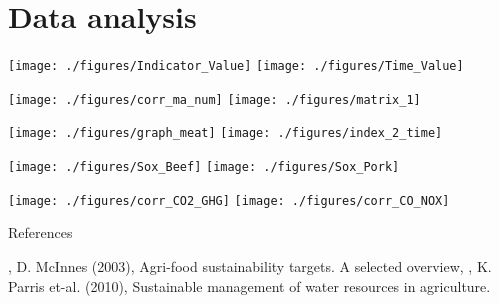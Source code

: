 \documentclass[t,9pt,aspectratio=169]{beamer}
\begin{document}
\section{Data analysis}
\begin{frame}
\begin{center}
\texttt{[image: ./figures/Indicator\_Value]}  \texttt{[image: ./figures/Time\_Value]}
\end{center}
\end{frame} 

\begin{frame}
\begin{center}
\texttt{[image: ./figures/corr\_ma\_num]} \texttt{[image: ./figures/matrix\_1]} 
\end{center}
\end{frame} 

\begin{frame}
\begin{center}
\texttt{[image: ./figures/graph\_meat]} \texttt{[image: ./figures/index\_2\_time]} 
\end{center}
\end{frame} 

\begin{frame}
\begin{center}
\texttt{[image: ./figures/Sox\_Beef]} \texttt{[image: ./figures/Sox\_Pork]} 
\end{center}
\end{frame}

\begin{frame}
\begin{center}
\texttt{[image: ./figures/corr\_CO2\_GHG]} \texttt{[image: ./figures/corr\_CO\_NOX]} 
\end{center}
\end{frame}  

\begin{frame}
{References}
\begin{footnotesize}
\begin{thebibliography}{1}
, D. McInnes (2003), Agri-food sustainability targets. A selected overview, 
,
K. Parris et-al. (2010), Sustainable management of water resources in agriculture. 
\end{thebibliography}
\end{footnotesize}
\vspace{0.5cm}


\end{frame}
\end{document}
